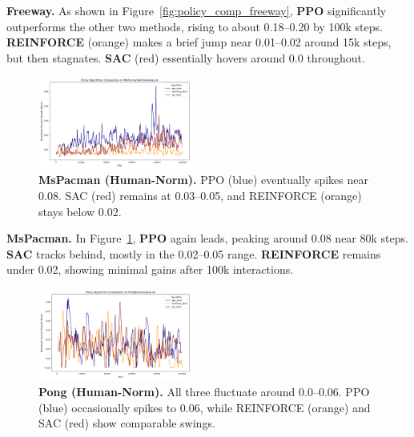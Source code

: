 \noindent
\textbf{Freeway.} As shown in Figure~\ref{fig:policy_comp_freeway}, \textbf{PPO} significantly outperforms the other two methods, rising to about 0.18--0.20 by 100k steps. \textbf{REINFORCE} (orange) makes a brief jump near 0.01--0.02 around 15k steps, but then stagnates. \textbf{SAC} (red) essentially hovers around 0.0 throughout.

\begin{figure}[htbp]
	\centering
	\includegraphics[width=0.45\textwidth]{figures/policy_comparison/charts_episodic_return_human_comparison_MsPacmanNoFrameskip-v4_policy.png}
	\caption{\textbf{MsPacman (Human-Norm).} PPO (blue) eventually spikes near 0.08. SAC (red) remains at 0.03--0.05, and REINFORCE (orange) stays below 0.02.}
	\label{fig:policy_comp_mspacman}
\end{figure}

\noindent
\textbf{MsPacman.} In Figure~\ref{fig:policy_comp_mspacman}, \textbf{PPO} again leads, peaking around 0.08 near 80k steps. \textbf{SAC} tracks behind, mostly in the 0.02--0.05 range. \textbf{REINFORCE} remains under 0.02, showing minimal gains after 100k interactions.

\begin{figure}[htbp]
	\centering
	\includegraphics[width=0.45\textwidth]{figures/policy_comparison/charts_episodic_return_human_comparison_PongNoFrameskip-v4_policy.png}
	\caption{\textbf{Pong (Human-Norm).} All three fluctuate around 0.0--0.06. PPO (blue) occasionally spikes to 0.06, while REINFORCE (orange) and SAC (red) show comparable swings.}
	\label{fig:policy_comp_pong}
\end{figure}

